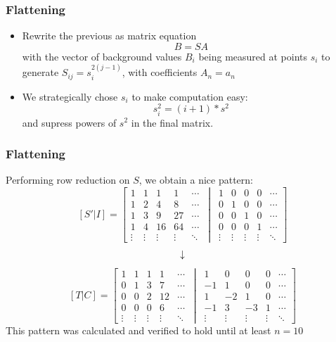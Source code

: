 \documentclass{beamer}
\begin{document}
\begin{frame}
	\frametitle{Flattening}
	\begin{itemize}
		\item<1-> Rewrite the previous as matrix equation
			\[B = SA\]
			with the vector of background values \(B_i\) being measured at points \(s_i\) to generate \(S_{ij} = s_i^{2(j-1)}\), with coefficients \(A_n = a_n\) 
		\item<2-> We strategically chose \(s_i\) to make computation easy:
			\[s_i^2 = (i+1)*s^2\]
			and supress powers of \(s^2\) in the final matrix.
	\end{itemize}
\end{frame}

\begin{frame}
	\frametitle{Flattening}
	Performing row reduction on \(S\), we obtain a nice pattern:
	\[ [S'|I] = \left[ \begin{matrix} 1 & 1 & 1 & 1 & \cdots \\
			1 & 2 & 4 & 8 & \cdots \\
			1 & 3 & 9 & 27 & \cdots \\
			1 & 4 & 16 & 64 & \cdots\\
			\vdots & \vdots & \vdots & \vdots & \ddots
	\end{matrix} \,\middle\vert\, \begin{matrix}
			1 & 0 & 0 & 0 & \cdots \\
			0 & 1 & 0 & 0 & \cdots \\
			0 & 0 & 1 & 0 & \cdots \\
			0 & 0 & 0 & 1 & \cdots\\
			\vdots & \vdots & \vdots & \vdots & \ddots
	\end{matrix} \right]\]
	\[\downarrow\]
	\[ [T|C] = \left[ \begin{matrix}
			1 & 1 & 1 & 1 & \cdots\\
			0 & 1 & 3 & 7 & \cdots\\
			0 & 0 & 2 & 12 & \cdots\\
			0 & 0 & 0 & 6 & \cdots \\
			\vdots & \vdots & \vdots & \vdots & \ddots
	\end{matrix} \,\middle\vert\, \begin{matrix}
			1 & 0 & 0 & 0 &\cdots \\
			-1 & 1 & 0 & 0 &\cdots \\
			1 & -2 & 1 & 0 &\cdots \\
			-1 & 3 & -3 & 1 &\cdots \\
			\vdots & \vdots & \vdots & \vdots & \ddots
	\end{matrix} \right]\]
	This pattern was calculated and verified to hold until at least \(n=10\)
\end{frame}
\end{document}
